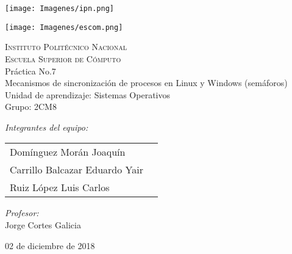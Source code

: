 \documentclass[12pt]{article}
\begin{document}
		\begin{titlepage}
			\begin{center}
				\noindent
				\begin{minipage}{0.5\textwidth}
					\begin{flushleft} \large
					\texttt{[image: Imagenes/ipn.png]}
					\end{flushleft}
				\end{minipage}%
				\begin{minipage}{0.55\textwidth}
					\begin{flushright} \large
			       	\texttt{[image: Imagenes/escom.png]}
					\end{flushright}
				\end{minipage}
				\textsc{\LARGE Instituto Politécnico Nacional}\\[0.5cm]
				\textsc{\Large Escuela Superior de Cómputo}\\[1cm]
				{ \huge Práctica No.7 \\[1cm] }
				{\huge Mecanismos  de sincronización de procesos en Linux y Windows (semáforos)\\[1cm]}
				{ \Large Unidad de aprendizaje: Sistemas Operativos} \\[1cm]
				{ \Large Grupo: 2CM8 } \\[1cm]
				\noindent
				\begin{minipage}{0.5\textwidth}
					\begin{flushleft} \large
						\emph{Integrantes del equipo:}\\
						\begin{tabular}{ll}
					     Domínguez Morán Joaquín\\
					     Carrillo Balcazar Eduardo Yair\\
					     Ruiz López Luis Carlos\\
					\end{tabular}
					\end{flushleft}
				\end{minipage}%
				\begin{minipage}{0.5\textwidth}
					\begin{flushright} \large
						\emph{Profesor:} \\
						Jorge Cortes Galicia 
					\end{flushright}
				\end{minipage}
				
				\vfill
				{\large 02 de diciembre de 2018}
			\end{center}
		\end{titlepage}
		
\end{document}
